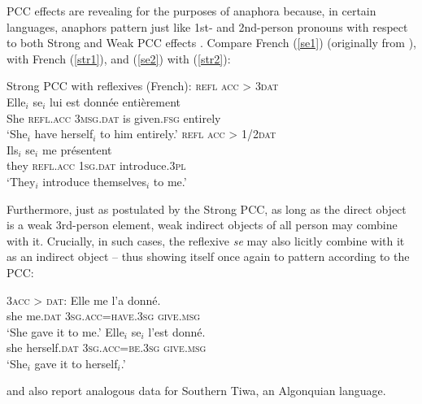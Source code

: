 \documentclass[output=paper, modfonts, nonflat]{langsci/langscibook}
\begin{document}
\noindent PCC effects are revealing for the purposes of anaphora because, in
certain languages, anaphors pattern just like 1st- and 2nd-person
pronouns with respect to both Strong and Weak PCC effects
\citep{kayne:1975, herschensohn:1979, bonet:1991, anag:2003,
  anag:2005, rivero:2004, nevins:2007, adgerharbour:2007}. Compare
French (\ref{se1}) (originally from \citealt[173]{kayne:1975}), with
French (\ref{str1}), and (\ref{se2}) with (\ref{str2}):\largerpage[-2]

\ea\label{rpcc} Strong PCC with reflexives (French):
  \ea\label{se1}  \textsc{refl acc} > \textsc{3dat}\\
\gll * Elle$_i$ se$_i$ lui est donn\'ee enti\`erement\\
{} She \textsc{refl.acc} \textsc{3msg.dat} is given.\textsc{fsg}
entirely\\
\glt `She$_i$ have herself$_i$ to him entirely.'
\ex\label{se2}  \textsc{refl acc} > \textsc{1/2dat}\\
\gll * Ils$_i$ se$_i$ me pr\'esentent\\
{} they \textsc{refl.acc} \textsc{1sg.dat} introduce.\textsc{3pl}\\
\glt `They$_i$ introduce themselves$_i$ to me.'
\z
\z

\noindent Furthermore, just as postulated by the Strong PCC, as long as the
direct object is a weak 3rd-person element, weak indirect objects of
all person may combine with it. Crucially, in such cases, the
reflexive \textit{se} may also licitly combine with it as an indirect
object -- thus showing itself once again to pattern according to the
PCC:

\ea\label{goodpcc}  \textsc{3acc} > \textsc{dat}:
\ea\label{mepcc}\gll Elle me l'a donn\'e.\\
she me.\textsc{dat} {\textsc{3sg.acc=have.3sg}} \textsc{give.msg}\\
\glt `She gave it to me.'
\ex\label{sepcc}\gll Elle$_i$ se$_i$ l'est donn\'e.\\
she herself.\textsc{dat} \textsc{3sg.acc=be.3sg} \textsc{give.msg}\\
\glt `She$_i$ gave it to herself$_i$.'  \z \z

\noindent \citet{rosen:1990} and \citet{baker:2008} also report analogous data for
Southern Tiwa, an Algonquian language. 

\end{document}
